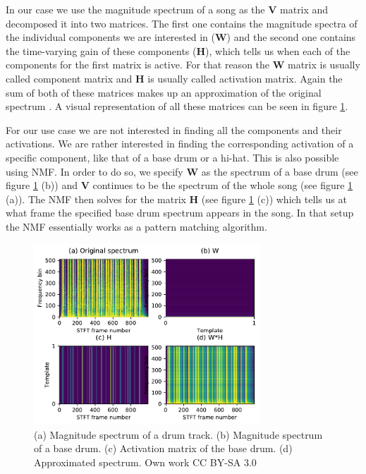 \documentclass{article}
\begin{document}
In our case we use the magnitude spectrum of a song as the $\mathbf{V}$ matrix and decomposed it into two matrices.
The first one contains the magnitude spectra of the individual components we are interested in ($\mathbf{W}$) and the second one contains the time-varying gain of these components ($\mathbf{H}$), which tells us when each of the components for the first matrix is active.
For that reason the $\mathbf{W}$ matrix is usually called component matrix and $\mathbf{H}$ is usually called activation matrix.
Again the sum of both of these matrices makes up an approximation of the original spectrum \cite{smaragdis2003}.
A visual representation of all these matrices can be seen in figure \ref{fig:MatrixOverview}.

For our use case we are not interested in finding all the components and their activations.
We are rather interested in finding the corresponding activation of a specific component, like that of a base drum or a hi-hat.
This is also possible using NMF.
In order to do so, we specify $\mathbf{W}$ as the spectrum of a base drum (see figure \ref{fig:MatrixOverview} (b)) and $\mathbf{V}$ continues to be the spectrum of the whole song (see figure \ref{fig:MatrixOverview} (a)).
The NMF then solves for the matrix $\mathbf{H}$ (see figure \ref{fig:MatrixOverview} (c)) which tells us at what frame the specified base drum spectrum appears in the song.
In that setup the NMF essentially works as a pattern matching algorithm.

\begin{figure}[htb]

\begin{minipage}[b]{1.0\linewidth}
  \centering
  \centerline{\includegraphics[width=8.5cm]{figures/MatrixOverview}}
  \medskip
\end{minipage}

\caption{(a) Magnitude spectrum of a drum track. (b) Magnitude spectrum of a base drum. (c) Activation matrix of the base drum. (d) Approximated spectrum. \scriptsize{\textsf{\textcopyright} Own work CC BY-SA 3.0}}
\label{fig:MatrixOverview}

\end{figure}
\end{document}
